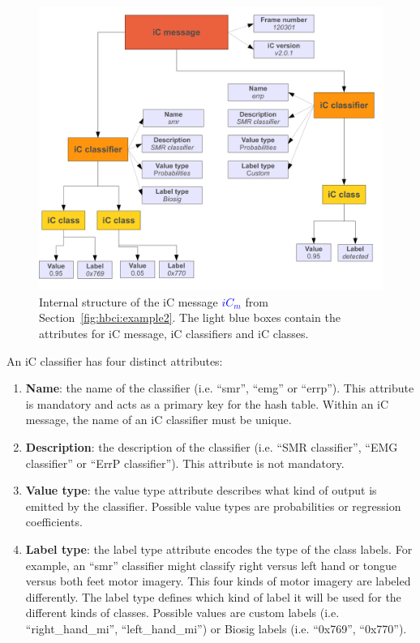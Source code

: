 \documentclass[a4paper,10pt]{article}
\newcommand{\temp}[1]{\textcolor{blue}{\textbf{#1}}}
\begin{document}
\begin{figure}[!htb]
  \begin{center}
	\includegraphics[width=\textwidth]{figures/icmessage.pdf}
	\caption{Internal structure of the iC message \temp{$iC_{m}$} from 
	  Section~\ref{fig:hbci:example2}. The light blue boxes contain the
	  attributes for iC message, iC classifiers and iC classes.}
	\label{fig:hbci:icmessage}
  \end{center}
\end{figure}
\noindent An iC classifier has four distinct attributes:
\begin{enumerate}
  \item {\bf Name}: the name of the classifier (i.e. ``smr'', ``emg'' or
  ``errp''). This attribute is mandatory and acts as a primary key for the hash
  table. Within an iC message, the name of an iC classifier must be unique.
  \item {\bf Description}: the description of the classifier (i.e. ``SMR
  classifier'', ``EMG classifier'' or ``ErrP classifier''). This attribute is
  not mandatory.
  \item {\bf Value type}: the value type attribute describes what kind of output
  is emitted by the classifier. Possible value types are probabilities or 
  regression coefficients.
  \item {\bf Label type}: the label type attribute encodes the type of the class
  labels. For example, an ``smr'' classifier might classify right versus left
  hand or tongue versus both feet motor imagery. This four kinds of motor
  imagery are labeled differently. The label type defines which kind of label it
  will be used for the different kinds of classes. Possible values are custom
  labels (i.e. ``right\_hand\_mi'', ``left\_hand\_mi'') or Biosig labels (i.e.
  ``0x769'', ``0x770''). 
\end{enumerate}
\end{document}
